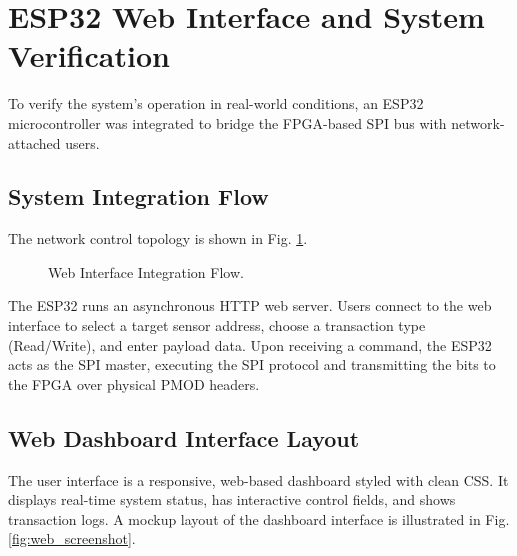 \documentclass[conference]{IEEEtran}
\begin{document}
\section{ESP32 Web Interface and System Verification}
To verify the system's operation in real-world conditions, an ESP32 microcontroller was integrated to bridge the FPGA-based SPI bus with network-attached users.

\subsection{System Integration Flow}
The network control topology is shown in Fig. \ref{fig:web_interface}.

\begin{figure}[htbp]
\centering
{}
\caption{Web Interface Integration Flow.}
\label{fig:web_interface}
\end{figure}

The ESP32 runs an asynchronous HTTP web server. Users connect to the web interface to select a target sensor address, choose a transaction type (Read/Write), and enter payload data. Upon receiving a command, the ESP32 acts as the SPI master, executing the SPI protocol and transmitting the bits to the FPGA over physical PMOD headers.

\subsection{Web Dashboard Interface Layout}
The user interface is a responsive, web-based dashboard styled with clean CSS. It displays real-time system status, has interactive control fields, and shows transaction logs. A mockup layout of the dashboard interface is illustrated in Fig. \ref{fig:web_screenshot}.
\end{document}
